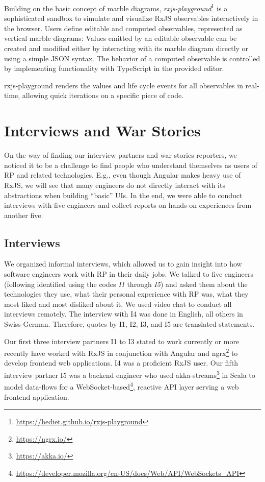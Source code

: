 \documentclass[sigplan,screen,review]{acmart}
\begin{document}
Building on the basic concept of marble diagrams, \emph{rxjs-playground}\footnote{\url{https://hediet.github.io/rxjs-playground}} is a sophisticated sandbox to simulate and visualize RxJS observables interactively in the browser. Users define editable and computed observables, represented as vertical marble diagrams: Values emitted by an editable observable can be created and modified either by interacting with its marble diagram directly or using a simple JSON syntax. The behavior of a computed observable is controlled by implementing functionality with TypeScript in the provided editor.

rxjs-playground renders the values and life cycle events for all observables in real-time, allowing quick iterations on a specific piece of code.


\section{Interviews and War Stories}
\label{sec:interviews}

On the way of finding our interview partners and war stories reporters, we noticed it to be a challenge to find people who understand themselves as users of RP and related technologies. E.g., even though Angular makes heavy use of RxJS, we will see that many engineers do not directly interact with its abstractions when building ``basic'' UIs. In the end, we were able to conduct interviews with five engineers and collect reports on hands-on experiences from another five.

\subsection{Interviews}

We organized informal interviews, which allowed us to gain insight into how software engineers work with RP in their daily jobs. We talked to five engineers (following identified using the codes \emph{I1} through \emph{I5}) and asked them about the technologies they use, what their personal experience with RP was, what they most liked and most disliked about it. We used video chat to conduct all interviews remotely. The interview with I4 was done in English, all others in Swiss-German. Therefore, quotes by I1, I2, I3, and I5 are translated statements.

Our first three interview partners I1 to I3 stated to work currently or more recently have worked with RxJS in conjunction with Angular and ngrx\footnote{\url{https://ngrx.io/}} to develop frontend web applications. I4 was a proficient RxJS user. Our fifth interview partner I5 was a backend engineer who used akka-streams\footnote{\url{https://akka.io/}} in Scala to model data-flows for a WebSocket-based\footnote{\url{https://developer.mozilla.org/en-US/docs/Web/API/WebSockets_API}}, reactive API layer serving a web frontend application.
\end{document}
